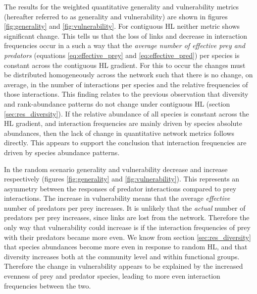 The results for the weighted quantitative generality and vulnerability metrics (hereafter referred to as generality and vulnerability) are shown in figures \ref{fig:generality} and \ref{fig:vulnerability}. For contiguous HL neither metric shows significant change. This tells us that the loss of links and decrease in interaction frequencies occur in a such a way that the \emph{average number of effective prey and predators} (equations \eqref{eq:effective_prey} and \eqref{eq:effective_pred}) per species is constant across the contiguous HL gradient. For this to occur the changes must be distributed homogeneously across the network such that there is no change, on average, in the number of interactions per species and the relative frequencies of those interactions. This finding relates to the previous observation that diversity and rank-abundance patterns do not change under contiguous HL (section \ref{sec:res_diversity}). If the relative abundance of all species is constant across the HL gradient, and interaction frequencies are mainly driven by species absolute abundances, then the lack of change in quantitative network metrics follows directly. This appears to support the conclusion that interaction frequencies are driven by species abundance patterns.

In the random scenario generality and vulnerability decrease and increase respectively (figures \ref{fig:generality} and \ref{fig:vulnerability}). This represents an asymmetry between the responses of predator interactions compared to prey interactions. The increase in vulnerability means that the average \emph{effective} number of predators per prey increases. It is unlikely that the \emph{actual} number of predators per prey increases, since links are lost from the network. Therefore the only way that vulnerability could increase is if the interaction frequencies of prey with their predators became more even. We know from section \ref{sec:res_diversity} that species abundances become more even in response to random HL, and that diversity increases both at the community level and within functional groups. Therefore the change in vulnerability appears to be explained by the increased evenness of prey and predator species, leading to more even interaction frequencies between the two.  

